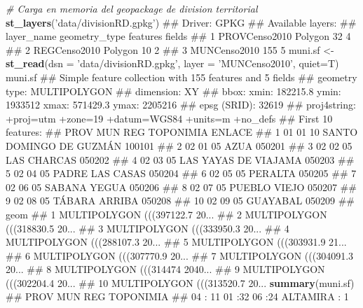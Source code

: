 \documentclass[11pt,]{article}
\newenvironment{Shaded}{\begin{snugshade}}{\end{snugshade}}
\newcommand{\KeywordTok}[1]{\textcolor[rgb]{0.13,0.29,0.53}{\textbf{#1}}}
\newcommand{\DataTypeTok}[1]{\textcolor[rgb]{0.13,0.29,0.53}{#1}}
\newcommand{\StringTok}[1]{\textcolor[rgb]{0.31,0.60,0.02}{#1}}
\newcommand{\CommentTok}[1]{\textcolor[rgb]{0.56,0.35,0.01}{\textit{#1}}}
\newcommand{\NormalTok}[1]{#1}
\begin{document}
\begin{Shaded}
\begin{Highlighting}[]
\CommentTok{# Carga en memoria del geopackage de division territorial}
\KeywordTok{st_layers}\NormalTok{(}\StringTok{'data/divisionRD.gpkg'}\NormalTok{)}
\NormalTok{## Driver: GPKG }
\NormalTok{## Available layers:}
\NormalTok{##      layer_name geometry_type features fields}
\NormalTok{## 1 PROVCenso2010       Polygon       32      4}
\NormalTok{## 2  REGCenso2010       Polygon       10      2}
\NormalTok{## 3  MUNCenso2010                    155      5}
\NormalTok{muni.sf <-}\StringTok{ }\KeywordTok{st_read}\NormalTok{(}\DataTypeTok{dsn =} \StringTok{'data/divisionRD.gpkg'}\NormalTok{, }\DataTypeTok{layer =} \StringTok{'MUNCenso2010'}\NormalTok{, }\DataTypeTok{quiet=}\NormalTok{T)}
\NormalTok{muni.sf}
\NormalTok{## Simple feature collection with 155 features and 5 fields}
\NormalTok{## geometry type:  MULTIPOLYGON}
\NormalTok{## dimension:      XY}
\NormalTok{## bbox:           xmin: 182215.8 ymin: 1933512 xmax: 571429.3 ymax: 2205216}
\NormalTok{## epsg (SRID):    32619}
\NormalTok{## proj4string:    +proj=utm +zone=19 +datum=WGS84 +units=m +no_defs}
\NormalTok{## First 10 features:}
\NormalTok{##    PROV MUN REG               TOPONIMIA ENLACE}
\NormalTok{## 1    01  01  10 SANTO DOMINGO DE GUZMÁN 100101}
\NormalTok{## 2    02  01  05                    AZUA 050201}
\NormalTok{## 3    02  02  05             LAS CHARCAS 050202}
\NormalTok{## 4    02  03  05    LAS YAYAS DE VIAJAMA 050203}
\NormalTok{## 5    02  04  05         PADRE LAS CASAS 050204}
\NormalTok{## 6    02  05  05                 PERALTA 050205}
\NormalTok{## 7    02  06  05            SABANA YEGUA 050206}
\NormalTok{## 8    02  07  05            PUEBLO VIEJO 050207}
\NormalTok{## 9    02  08  05           TÁBARA ARRIBA 050208}
\NormalTok{## 10   02  09  05                GUAYABAL 050209}
\NormalTok{##                              geom}
\NormalTok{## 1  MULTIPOLYGON (((397122.7 20...}
\NormalTok{## 2  MULTIPOLYGON (((318830.5 20...}
\NormalTok{## 3  MULTIPOLYGON (((333950.3 20...}
\NormalTok{## 4  MULTIPOLYGON (((288107.3 20...}
\NormalTok{## 5  MULTIPOLYGON (((303931.9 21...}
\NormalTok{## 6  MULTIPOLYGON (((307770.9 20...}
\NormalTok{## 7  MULTIPOLYGON (((304091.3 20...}
\NormalTok{## 8  MULTIPOLYGON (((314474 2040...}
\NormalTok{## 9  MULTIPOLYGON (((302204.4 20...}
\NormalTok{## 10 MULTIPOLYGON (((313520.7 20...}
\KeywordTok{summary}\NormalTok{(muni.sf)}
\NormalTok{##       PROV          MUN          REG              TOPONIMIA  }
\NormalTok{##  04     : 11   01     :32   06     :24   ALTAMIRA      :  1  }

\end{Highlighting}
\end{Shaded}
\end{document}

